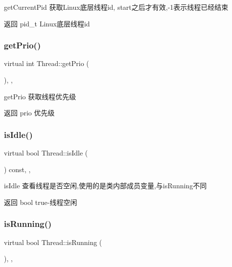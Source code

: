 get\+Current\+Pid 获取\+Linux底层线程id, start之后才有效,-\/1表示线程已经结束 

\begin{DoxyReturn}{返回}
pid\+\_\+t Linux底层线程id 
\end{DoxyReturn}
\mbox{\label{classThread_a712ab58b9e89f458427b213b1197a666}} 
\subsubsection{\texorpdfstring{get\+Prio()}{getPrio()}}
{\footnotesize\ttfamily virtual int Thread\+::get\+Prio (\begin{DoxyParamCaption}{ }\end{DoxyParamCaption})\hspace{0.3cm}{\ttfamily [inline]}, {\ttfamily [final]}, {\ttfamily [virtual]}}



get\+Prio 获取线程优先级 

\begin{DoxyReturn}{返回}
prio 优先级 
\end{DoxyReturn}
\mbox{\label{classThread_acb6c590deecea4778a855459f080060a}} 
\subsubsection{\texorpdfstring{is\+Idle()}{isIdle()}}
{\footnotesize\ttfamily virtual bool Thread\+::is\+Idle (\begin{DoxyParamCaption}{ }\end{DoxyParamCaption}) const\hspace{0.3cm}{\ttfamily [inline]}, {\ttfamily [final]}, {\ttfamily [virtual]}}



is\+Idle 查看线程是否空闲,使用的是类内部成员变量,与is\+Running不同 

\begin{DoxyReturn}{返回}
bool true-\/线程空闲 
\end{DoxyReturn}
\mbox{\label{classThread_ab4c718f3ca4aa7514c7e89e38f9da894}} 
\subsubsection{\texorpdfstring{is\+Running()}{isRunning()}}
{\footnotesize\ttfamily virtual bool Thread\+::is\+Running (\begin{DoxyParamCaption}{ }\end{DoxyParamCaption})\hspace{0.3cm}{\ttfamily [inline]}, {\ttfamily [final]}, {\ttfamily [virtual]}}



